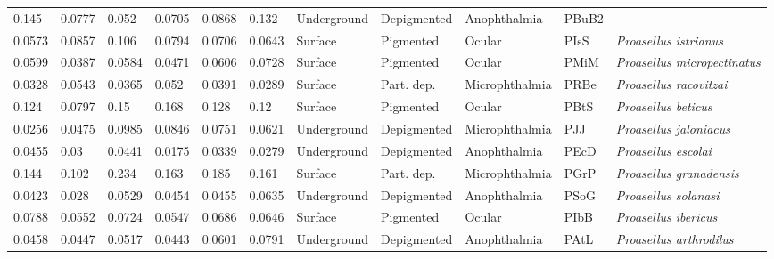 \begin{tabular}{lllllllllll}
         0.145 &              0.0777 &          0.052 &         0.0705 &         0.0868 &          0.132 &  Underground &  Depigmented &     Anophthalmia &    PBuB2 &                               \textit{-} \\
        0.0573 &              0.0857 &          0.106 &         0.0794 &         0.0706 &         0.0643 &      Surface &    Pigmented &           Ocular &     PIsS &            \textit{Proasellus istrianus} \\
        0.0599 &              0.0387 &         0.0584 &         0.0471 &         0.0606 &         0.0728 &      Surface &    Pigmented &           Ocular &     PMiM &      \textit{Proasellus micropectinatus} \\
        0.0328 &              0.0543 &         0.0365 &          0.052 &         0.0391 &         0.0289 &      Surface &   Part. dep. &   Microphthalmia &     PRBe &           \textit{Proasellus racovitzai} \\
         0.124 &              0.0797 &           0.15 &          0.168 &          0.128 &           0.12 &      Surface &    Pigmented &           Ocular &     PBtS &              \textit{Proasellus beticus} \\
        0.0256 &              0.0475 &         0.0985 &         0.0846 &         0.0751 &         0.0621 &  Underground &  Depigmented &   Microphthalmia &      PJJ &           \textit{Proasellus jaloniacus} \\
        0.0455 &                0.03 &         0.0441 &         0.0175 &         0.0339 &         0.0279 &  Underground &  Depigmented &     Anophthalmia &     PEcD &              \textit{Proasellus escolai} \\
         0.144 &               0.102 &          0.234 &          0.163 &          0.185 &          0.161 &      Surface &   Part. dep. &   Microphthalmia &     PGrP &          \textit{Proasellus granadensis} \\
        0.0423 &               0.028 &         0.0529 &         0.0454 &         0.0455 &         0.0635 &  Underground &  Depigmented &     Anophthalmia &     PSoG &             \textit{Proasellus solanasi} \\
        0.0788 &              0.0552 &         0.0724 &         0.0547 &         0.0686 &         0.0646 &      Surface &    Pigmented &           Ocular &     PIbB &             \textit{Proasellus ibericus} \\
        0.0458 &              0.0447 &         0.0517 &         0.0443 &         0.0601 &         0.0791 &  Underground &  Depigmented &     Anophthalmia &     PAtL &          \textit{Proasellus arthrodilus} \\

\end{tabular}
